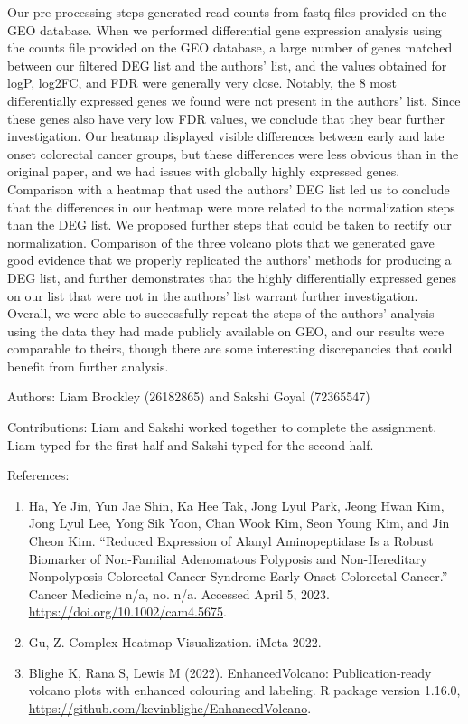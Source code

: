 \documentclass[
]{article}
\begin{document}
Our pre-processing steps generated read counts from fastq files provided
on the GEO database. When we performed differential gene expression
analysis using the counts file provided on the GEO database, a large
number of genes matched between our filtered DEG list and the authors'
list, and the values obtained for logP, log2FC, and FDR were generally
very close. Notably, the 8 most differentially expressed genes we found
were not present in the authors' list. Since these genes also have very
low FDR values, we conclude that they bear further investigation. Our
heatmap displayed visible differences between early and late onset
colorectal cancer groups, but these differences were less obvious than
in the original paper, and we had issues with globally highly expressed
genes. Comparison with a heatmap that used the authors' DEG list led us
to conclude that the differences in our heatmap were more related to the
normalization steps than the DEG list. We proposed further steps that
could be taken to rectify our normalization. Comparison of the three
volcano plots that we generated gave good evidence that we properly
replicated the authors' methods for producing a DEG list, and further
demonstrates that the highly differentially expressed genes on our list
that were not in the authors' list warrant further investigation.
Overall, we were able to successfully repeat the steps of the authors'
analysis using the data they had made publicly available on GEO, and our
results were comparable to theirs, though there are some interesting
discrepancies that could benefit from further analysis.

Authors: Liam Brockley (26182865) and Sakshi Goyal (72365547)

Contributions: Liam and Sakshi worked together to complete the
assignment. Liam typed for the first half and Sakshi typed for the
second half.

References:

\begin{enumerate}
\def\labelenumi{\arabic{enumi}.}
\item
  Ha, Ye Jin, Yun Jae Shin, Ka Hee Tak, Jong Lyul Park, Jeong Hwan Kim,
  Jong Lyul Lee, Yong Sik Yoon, Chan Wook Kim, Seon Young Kim, and Jin
  Cheon Kim. ``Reduced Expression of Alanyl Aminopeptidase Is a Robust
  Biomarker of Non-Familial Adenomatous Polyposis and Non-Hereditary
  Nonpolyposis Colorectal Cancer Syndrome Early-Onset Colorectal
  Cancer.'' Cancer Medicine n/a, no. n/a. Accessed April 5, 2023.
  \url{https://doi.org/10.1002/cam4.5675}.
\item
  Gu, Z. Complex Heatmap Visualization. iMeta 2022.
\item
  Blighe K, Rana S, Lewis M (2022). EnhancedVolcano: Publication-ready
  volcano plots with enhanced colouring and labeling. R package version
  1.16.0, \url{https://github.com/kevinblighe/EnhancedVolcano}.
\end{enumerate}
\end{document}
